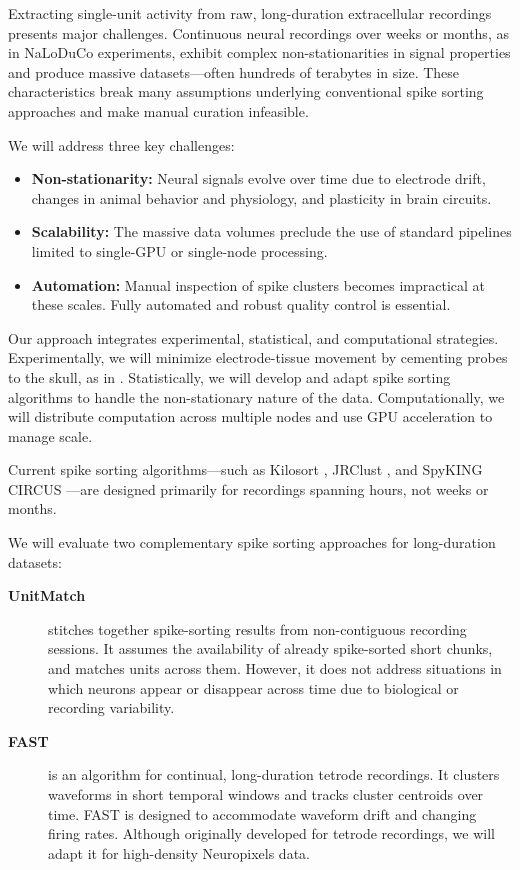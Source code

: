 Extracting single-unit activity from raw, long-duration extracellular
recordings presents major challenges. Continuous neural recordings over weeks
or months, as in NaLoDuCo experiments, exhibit complex non-stationarities in
signal properties and produce massive datasets—often hundreds of terabytes in
size. These characteristics break many assumptions underlying conventional
spike sorting approaches and make manual curation infeasible.

We will address three key challenges:

\begin{itemize}
    \item \textbf{Non-stationarity:} Neural signals evolve over time due to electrode drift, changes in animal behavior and physiology, and plasticity in brain circuits.
    \item \textbf{Scalability:} The massive data volumes preclude the use of standard pipelines limited to single-GPU or single-node processing.
    \item \textbf{Automation:} Manual inspection of spike clusters becomes impractical at these scales. Fully automated and robust quality control is essential.
\end{itemize}

Our approach integrates experimental, statistical, and computational strategies. Experimentally, we will minimize electrode-tissue movement by cementing probes to the skull, as in \citep{schoonoverEtAl21}. Statistically, we will develop and adapt spike sorting algorithms to handle the non-stationary nature of the data. Computationally, we will distribute computation across multiple nodes and use GPU acceleration to manage scale.

\label{sec:offlineMethodsNonStationarity}

Current spike sorting algorithms—such as Kilosort \citep{pachitariuEtAl24}, JRClust \citep{chungEtAl17}, and SpyKING CIRCUS \citep{ygerEtAl18}—are designed primarily for recordings spanning hours, not weeks or months.

We will evaluate two complementary spike sorting approaches for long-duration datasets:

\begin{description}
    \item[\textbf{UnitMatch}] \citep{vanBeestEtAl24} stitches together spike-sorting results from non-contiguous recording sessions. It assumes the availability of already spike-sorted short chunks, and matches units across them. However, it does not address situations in which neurons appear or disappear across time due to biological or recording variability.
    
    \item[\textbf{FAST}] \citep{dhawaleEtAl17} is an algorithm for continual, long-duration tetrode recordings. It clusters waveforms in short temporal windows and tracks cluster centroids over time. FAST is designed to accommodate waveform drift and changing firing rates. Although originally developed for tetrode recordings, we will adapt it for high-density Neuropixels data.
\end{description}

